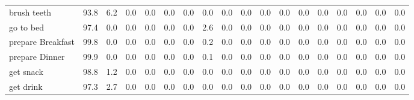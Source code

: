 \documentclass{article}
\begin{document}
\begin{sideways}
\begin{tabular}{lrrrrrrrrrrrrrrrrr}
brush teeth                   &        93.8 &                6.2 &           0.0 &               0.0 &                0.0 &                0.0 &              0.0 &                      0.0 &                   0.0 &              0.0 &              0.0 &                            0.0 &                      0.0 &                    0.0 &                                  0.0 &                          0.0 &                  0.0 \\
go to bed                     &        97.4 &                0.0 &           0.0 &               0.0 &                0.0 &                0.0 &              2.6 &                      0.0 &                   0.0 &              0.0 &              0.0 &                            0.0 &                      0.0 &                    0.0 &                                  0.0 &                          0.0 &                  0.0 \\
prepare Breakfast             &        99.8 &                0.0 &           0.0 &               0.0 &                0.0 &                0.0 &              0.2 &                      0.0 &                   0.0 &              0.0 &              0.0 &                            0.0 &                      0.0 &                    0.0 &                                  0.0 &                          0.0 &                  0.0 \\
prepare Dinner                &        99.9 &                0.0 &           0.0 &               0.0 &                0.0 &                0.0 &              0.1 &                      0.0 &                   0.0 &              0.0 &              0.0 &                            0.0 &                      0.0 &                    0.0 &                                  0.0 &                          0.0 &                  0.0 \\
get snack                     &        98.8 &                1.2 &           0.0 &               0.0 &                0.0 &                0.0 &              0.0 &                      0.0 &                   0.0 &              0.0 &              0.0 &                            0.0 &                      0.0 &                    0.0 &                                  0.0 &                          0.0 &                  0.0 \\
get drink                     &        97.3 &                2.7 &           0.0 &               0.0 &                0.0 &                0.0 &              0.0 &                      0.0 &                   0.0 &              0.0 &              0.0 &                            0.0 &                      0.0 &                    0.0 &                                  0.0 &                          0.0 &                  0.0 \\

\end{tabular}
\end{sideways}
\end{document}
